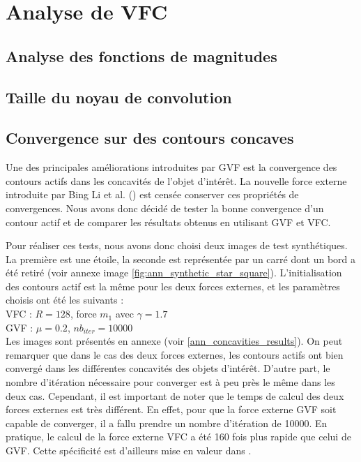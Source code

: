 
\section{Analyse de VFC}
\subsection{Analyse des fonctions de magnitudes}
\subsection{Taille du noyau de convolution}
\subsection{Convergence sur des contours concaves}
Une des principales améliorations introduites par GVF est la convergence des contours actifs dans les concavités de l'objet d'intérêt. La nouvelle force externe introduite par Bing Li et al. (\cite{vfc}) est censée conserver ces propriétés de convergences. Nous avons donc décidé de tester la bonne convergence d'un contour actif et de comparer les résultats obtenus en utilisant GVF et VFC.

Pour réaliser ces tests, nous avons donc choisi deux images de test synthétiques. La première est une étoile, la seconde est représentée par un carré dont un bord a été retiré (voir annexe image \ref{fig:ann_synthetic_star_square}). L'initialisation des contours actif est la même pour les deux forces externes, et les paramètres choisis ont été les suivants :\\

VFC : $R = 128$, force $m_{1}$ avec $\gamma = 1.7$\\
GVF : $\mu = 0.2$, $nb_{iter} = 10000$\\

Les images sont présentés en annexe (voir \ref{ann_concavities_results}). On peut remarquer que dans le cas des deux forces externes, les contours actifs ont bien convergé dans les différentes concavités des objets d'intérêt. D'autre part, le nombre d'itération nécessaire pour converger est à peu près le même dans les deux cas. Cependant, il est important de noter que le temps de calcul des deux forces externes est très différent. En effet, pour que la force externe GVF soit capable de converger, il a fallu prendre un nombre d'itération de 10000. En pratique, le calcul de la force externe VFC a été 160 fois plus rapide que celui de GVF. Cette spécificité est d'ailleurs mise en valeur dans \cite{vfc}. 

